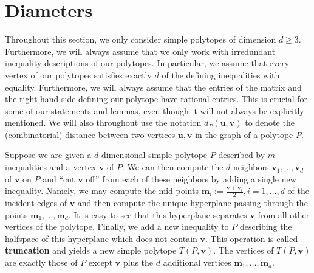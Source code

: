 \documentclass[centering,11pt,reqno]{amsart}
\theoremstyle{definition}
\begin{document}




\section{Diameters}\label{sec:truncate}

Throughout this section, we only consider simple polytopes of dimension $d\ge 3$. Furthermore, we will always assume that we only work with irredundant inequality descriptions of our polytopes. In particular, we assume that every vertex of our polytopes satisfies exactly $d$ of the defining inequalities with equality. Furthermore, we will always assume that the entries of the matrix and the right-hand side defining our polytope have rational entries.  This is crucial for some of our statements and lemmas, even though it will not always be explicitly mentioned. We will also throughout use the notation $d_P(\mathbf{u},\mathbf{v})$ to denote the (combinatorial) distance between two vertices $\mathbf{u}, \mathbf{v}$ in the graph of a polytope $P$. 

Suppose we are given a $d$-dimensional simple polytope $P$ described by $m$ inequalities and a vertex $\mathbf{v}$ of $P$. We can then compute the $d$ neighbors $\mathbf{v}_1,\ldots,\mathbf{v}_d$ of $\mathbf{v}$ on $P$ and ``cut $\mathbf{v}$ off'' from each of these neighbors by adding a single new inequality. Namely, we may compute the mid-points $\mathbf{m}_i:=\frac{\mathbf{v}+\mathbf{v}_i}{2}, i=1,\ldots,d$ of the incident edges of $\mathbf{v}$ and then compute the unique hyperplane passing through the points $\mathbf{m}_1,\ldots,\mathbf{m}_d$. It is easy to see that this hyperplane separates $\mathbf{v}$ from all other vertices of the polytope. Finally, we add a new inequality to $P$ describing the halfspace of this hyperplane which does not contain $\mathbf{v}$. This operation is called \textbf{truncation} and yields a new simple polytope $T(P,\mathbf{v})$. The vertices of $T(P,\mathbf{v})$ are exactly those of $P$ except $\mathbf{v}$ plus the $d$ additional vertices $\mathbf{m}_1,\ldots,\mathbf{m}_d$. 
\end{document}
